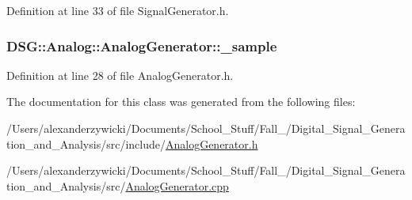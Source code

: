 Definition at line 33 of file Signal\-Generator.\-h.

\hypertarget{classDSG_1_1Analog_1_1AnalogGenerator_af20b26cee2cd03dfdb3d845f527b2f1c}{
\subsubsection[{\-\_\-sample}]{ D\-S\-G\-::\-Analog\-::\-Analog\-Generator\-::\-\_\-sample\hspace{0.3cm}{\ttfamily [protected]}}}\label{classDSG_1_1Analog_1_1AnalogGenerator_af20b26cee2cd03dfdb3d845f527b2f1c}


Definition at line 28 of file Analog\-Generator.\-h.



The documentation for this class was generated from the following files\-:\begin{DoxyCompactItemize}
\item 
/\-Users/alexanderzywicki/\-Documents/\-School\-\_\-\-Stuff/\-Fall\-\_/\-Digital\-\_\-\-Signal\-\_\-\-Generation\-\_\-and\-\_\-\-Analysis/src/include/\hyperlink{AnalogGenerator_8h}{Analog\-Generator.\-h}\item 
/\-Users/alexanderzywicki/\-Documents/\-School\-\_\-\-Stuff/\-Fall\-\_/\-Digital\-\_\-\-Signal\-\_\-\-Generation\-\_\-and\-\_\-\-Analysis/src/\hyperlink{AnalogGenerator_8cpp}{Analog\-Generator.\-cpp}\end{DoxyCompactItemize}
